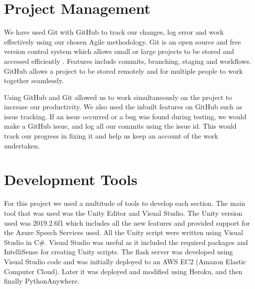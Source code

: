 \section{Project Management}
We have used Git with GitHub to track our changes, log error and work effectively using our chosen Agile methodology. Git is an open source and free version control system which allows small or large projects to be stored and accessed efficiently \cite{github}. Features include commits, branching, staging and workflows. GitHub allows a project to be stored remotely and for multiple people to work together seamlessly. 
\par
\medskip

Using GitHub and Git allowed us to work simultaneously on the project to increase our productivity. We also used the inbuilt features on GitHub such as issue tracking. If an issue occurred or a bug was found during testing, we would make a GitHub issue, and log all our commits using the issue id. This would track our progress in fixing it and help us keep an account of the work undertaken.

\section{Development Tools}
For this project we used a multitude of tools to develop each section. The main tool that was used was the Unity Editor and Visual Studio. The Unity version used was 2019.2.6f1 which includes all the new features and provided support for the Azure Speech Services used. All the Unity script were written using Visual Studio in C\#. Visual Studio was useful as it included the required packages and IntelliSense for creating Unity scripts. The flask server was developed using Visual Studio code and was initially deployed to an AWS EC2 (Amazon Elastic Computer Cloud). Later it was deployed and modified using Heroku, and then finally PythonAnywhere.

